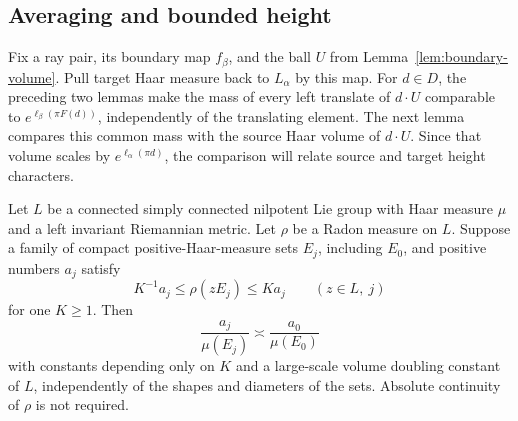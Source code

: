 \subsection{Averaging and bounded height}

Fix a ray pair, its boundary map $f_\beta$, and the ball $U$ from
Lemma~\ref{lem:boundary-volume}.  Pull target Haar measure back to
$L_\alpha$ by this map.  For $d\in D$, the preceding two lemmas make
the mass of every left translate of $d\cdot U$ comparable to
$e^{\ell_\beta(\pi F(d))}$, independently of the translating element.
The next lemma compares this common mass with the source Haar volume
of $d\cdot U$.  Since that volume scales by
$e^{\ell_\alpha(\pi d)}$, the comparison will relate source and target
height characters.

\begin{lemma}
\label{lem:haar-averaging}
Let $L$ be a connected simply connected nilpotent Lie group with
Haar measure $\mu$ and a left invariant Riemannian metric.
Let $\rho$ be a Radon measure on $L$.
Suppose a family of compact positive-Haar-measure sets $E_j$,
including $E_0$, and positive numbers $a_j$ satisfy
\[
 K^{-1}a_j\le\rho(zE_j)\le Ka_j
 \qquad(z\in L,\ j)
\]
for one $K\ge1$.  Then
\[
 \frac{a_j}{\mu(E_j)}\asymp
 \frac{a_0}{\mu(E_0)}
\]
with constants depending only on $K$ and a large-scale volume
doubling constant of $L$, independently of the shapes and diameters
of the sets.  Absolute continuity of $\rho$ is not required.
\end{lemma}


